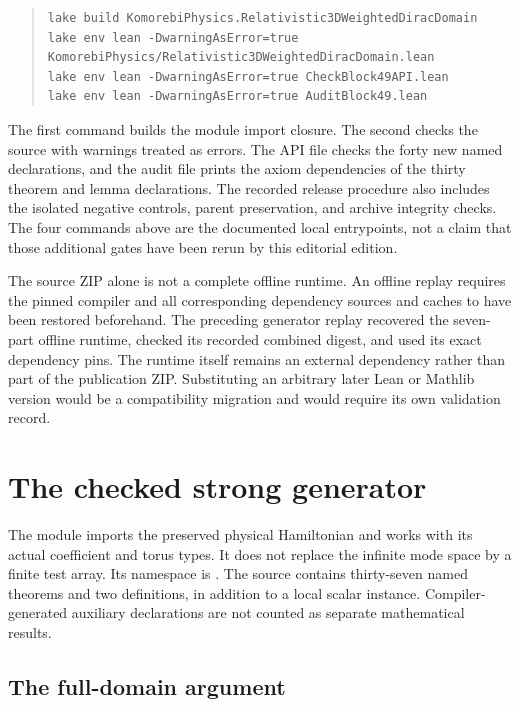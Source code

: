 \begin{quote}\small
\begin{Verbatim}[fontsize=\small,breaklines=true,breakanywhere=true]
lake build KomorebiPhysics.Relativistic3DWeightedDiracDomain
lake env lean -DwarningAsError=true KomorebiPhysics/Relativistic3DWeightedDiracDomain.lean
lake env lean -DwarningAsError=true CheckBlock49API.lean
lake env lean -DwarningAsError=true AuditBlock49.lean
\end{Verbatim}
\end{quote}

The first command builds the module import closure. The second checks the source with warnings treated as errors. The API file checks the forty new named declarations, and the audit file prints the axiom dependencies of the thirty theorem and lemma declarations. The recorded release procedure also includes the isolated negative controls, parent preservation, and archive integrity checks. The four commands above are the documented local entrypoints, not a claim that those additional gates have been rerun by this editorial edition.

The source ZIP alone is not a complete offline runtime. An offline replay requires the pinned compiler and all corresponding dependency sources and caches to have been restored beforehand. The preceding generator replay recovered the seven-part offline runtime, checked its recorded combined digest, and used its exact dependency pins. The runtime itself remains an external dependency rather than part of the publication ZIP. Substituting an arbitrary later Lean or Mathlib version would be a compatibility migration and would require its own validation record.

\section{The checked strong generator}

The module  imports the preserved physical Hamiltonian and works with its actual coefficient and torus types. It does not replace the infinite mode space by a finite test array. Its namespace is . The source contains thirty-seven named theorems and two definitions, in addition to a local scalar instance. Compiler-generated auxiliary declarations are not counted as separate mathematical results.

\subsection{The full-domain argument}

